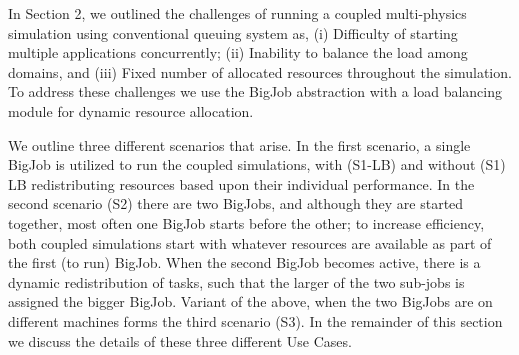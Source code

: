 \documentclass[conference,final]{IEEEtran}
\newcommand{\jhanote}[1]{ {\textcolor{red} { ***Jha: #1 }}}
\newcommand{\skonote}[1]{ {\textcolor{blue} { ***Jeff: #1 }}}
\newcommand{\jhanote}[1]{}
\newcommand{\skonote}[1]{}
\begin{document}
In Section 2, we outlined the challenges of running a coupled
multi-physics simulation using conventional queuing system as, (i)
Difficulty of starting multiple applications concurrently; (ii)
Inability to balance the load among domains, and (iii) Fixed number of
allocated resources throughout the simulation. To address these
challenges we use the BigJob abstraction with a load balancing module
for dynamic resource allocation.



We outline three different scenarios that arise. In the first
scenario, a single BigJob is utilized to run the coupled simulations,
with (S1-LB) and without (S1) LB redistributing resources based upon
their individual performance.  In the second scenario (S2) there are
two BigJobs, and although they are started together, most often one
BigJob starts before the other; to increase efficiency, both coupled
simulations start with whatever resources are available as part of the
first (to run) BigJob. When the second BigJob becomes active, there is
a dynamic redistribution of tasks, such that the larger of the two
sub-jobs is assigned the bigger BigJob. Variant of the above, when
the two BigJobs are on different machines forms the third scenario
(S3). In the remainder of this section we discuss the details of these
three different Use Cases.



%
\end{document}
